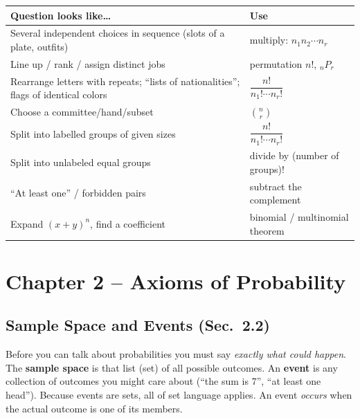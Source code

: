 \documentclass[11pt]{article}
\let\oldsubsection\subsection
\renewcommand{\subsection}{\Needspace{14\baselineskip}\oldsubsection}
\begin{document}
\begin{center}
\renewcommand{\arraystretch}{1.25}
\begin{tabular}{@{}>{\raggedright\arraybackslash}p{3.3in}>{\raggedright\arraybackslash}p{2.9in}@{}}
\toprule
\textbf{Question looks like\dots} & \textbf{Use}\\
\midrule
Several independent choices in sequence (slots of a plate, outfits) & multiply: $n_1n_2\cdots n_r$\\
Line up / rank / assign distinct jobs & permutation $n!$, ${}_nP_r$\\
Rearrange letters with repeats; ``lists of nationalities''; flags of identical colors & $\dfrac{n!}{n_1!\cdots n_r!}$\\
Choose a committee/hand/subset & $\binom nr$\\
Split into labelled groups of given sizes & $\dfrac{n!}{n_1!\cdots n_r!}$\\
Split into unlabeled equal groups & divide by (number of groups)$!$\\
``At least one'' / forbidden pairs & subtract the complement\\
Expand $(x+y)^n$, find a coefficient & binomial / multinomial theorem\\
\bottomrule
\end{tabular}
\end{center}

\clearpage
\section{Chapter 2 -- Axioms of Probability}\label{sec:ch2}

\subsection{Sample Space and Events (Sec.\ 2.2)}

\begin{ideabox}
Before you can talk about probabilities you must say \emph{exactly what could happen}. The \textbf{sample space} is that list (set) of all possible outcomes. An \textbf{event} is any collection of outcomes you might care about (``the sum is 7'', ``at least one head''). Because events are sets, all of set language applies. An event \emph{occurs} when the actual outcome is one of its members.
\end{ideabox}
\end{document}
